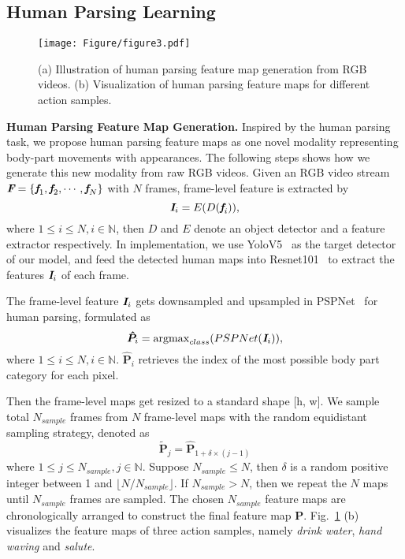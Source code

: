 \documentclass[runningheads]{llncs}
\begin{document}
\subsection{Human Parsing Learning}
\label{section:Parsing}
\begin{figure}[t]
\texttt{[image: Figure/figure3.pdf]}
\vspace{-1em}
\caption{(a) Illustration of human parsing feature map generation from RGB videos. (b) Visualization of human parsing feature maps for different action samples.}  \label{parsing}
\end{figure}

\textbf{Human Parsing Feature Map Generation.} Inspired by the human parsing task, we propose human parsing feature maps as one novel modality representing body-part movements with appearances. The following steps shows how we generate this new modality from raw RGB videos. Given an RGB video stream $\textit{\textbf{F}} = \left\{\textit{\textbf{f}}_{1}, \textit{\textbf{f}}_{2}, \cdots, \textit{\textbf{f}}_{N} \right\}$ with $N$ frames, frame-level feature is extracted by
\begin{equation}
\textit{$\textit{\textbf{I}}_{i}$} = E(D(\textit{\textbf{f}}_{i})),
\label{con:Equation2}
\end{equation}
where $1\leq i\leq N, i \in \mathbb{N}$, then $D$ and $E$ denote an object detector and a feature extractor respectively. In implementation, we use YoloV5~\cite{yolov5} as the target detector of our model, and feed the detected human maps into Resnet101~\cite{he2015deep} to extract the features $\textit{\textbf{I}}_{i}$ of each frame. 

The frame-level feature $\textit{\textbf{I}}_{i}$ gets downsampled and upsampled in PSPNet~\cite{Zhao_2017_CVPR} for human parsing, formulated as
\begin{equation}
\bm{\hat{P}}_{i} = \mathrm{argmax}_{class}(PSPNet(\textit{\textbf{I}}_{i})),
\label{con:Equation3}
\end{equation}
where $1\leq i\leq N, i \in \mathbb{N}$. $\bm{\hat{P}}_{i}$ retrieves the index of the most possible body part category for each pixel. 

Then the frame-level maps get resized to a standard shape [h, w]. We sample total $N_{sample}$ frames from $N$ frame-level maps with the random equidistant sampling strategy, denoted as 
\begin{equation}
    \bm{\tilde{P}}_{j} = \bm{\hat{P}}_{1+\delta\times (j-1)} 
\end{equation}
where $1\leq j\leq N_{sample}, j \in \mathbb{N}$. Suppose $N_{sample} \leq N$, then $\delta$ is a random positive integer between 1 and $\lfloor N/N_{sample} \rfloor$. If $N_{sample} > N$, then we repeat the $N$ maps until $N_{sample}$ frames are sampled. The chosen $N_{sample}$ feature maps are chronologically arranged to construct the final feature map $\bm{P}$. Fig.~\ref{parsing} (b) visualizes the feature maps of three action samples, namely \textit{drink water}, \textit{hand waving} and \textit{salute}.
\end{document}
